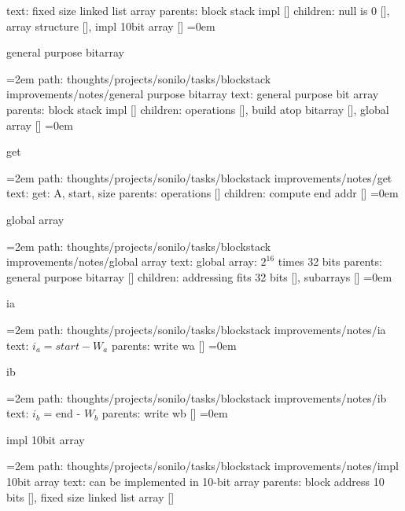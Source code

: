 \smallskip
text:  fixed size linked list array
\smallskip
parents:  block stack impl []
\smallskip
children: null is 0 [], array structure [], impl 10bit array []
\smallskip
\leftskip=0em
\par\endgroup
\bigskip
{}
general purpose bitarray
\smallskip
\par\begingroup
\leftskip=2em
path: thoughts/projects/sonilo/tasks/blockstack improvements/notes/general purpose bitarray
\smallskip
text:  general purpose bit array
\smallskip
parents:  block stack impl []
\smallskip
children: operations [], build atop bitarray [], global array []
\smallskip
\leftskip=0em
\par\endgroup
\bigskip
{}
get
\smallskip
\par\begingroup
\leftskip=2em
path: thoughts/projects/sonilo/tasks/blockstack improvements/notes/get
\smallskip
text:  get: A, start, size
\smallskip
parents:  operations []
\smallskip
children: compute end addr []
\smallskip
\leftskip=0em
\par\endgroup
\bigskip
{}
global array
\smallskip
\par\begingroup
\leftskip=2em
path: thoughts/projects/sonilo/tasks/blockstack improvements/notes/global array
\smallskip
text:  global array: $2^16$ times 32 bits
\smallskip
parents:  general purpose bitarray []
\smallskip
children: addressing fits 32 bits [], subarrays []
\smallskip
\leftskip=0em
\par\endgroup
\bigskip
{}
ia
\smallskip
\par\begingroup
\leftskip=2em
path: thoughts/projects/sonilo/tasks/blockstack improvements/notes/ia
\smallskip
text:  $i_a = start - W_a$
\smallskip
parents:  write wa []
\smallskip
\leftskip=0em
\par\endgroup
\bigskip
{}
ib
\smallskip
\par\begingroup
\leftskip=2em
path: thoughts/projects/sonilo/tasks/blockstack improvements/notes/ib
\smallskip
text:  $i_b$ = end - $W_b$
\smallskip
parents:  write wb []
\smallskip
\leftskip=0em
\par\endgroup
\bigskip
{}
impl 10bit array
\smallskip
\par\begingroup
\leftskip=2em
path: thoughts/projects/sonilo/tasks/blockstack improvements/notes/impl 10bit array
\smallskip
text:  can be implemented in 10-bit array
\smallskip
parents:  block address 10 bits [], fixed size linked list array []
